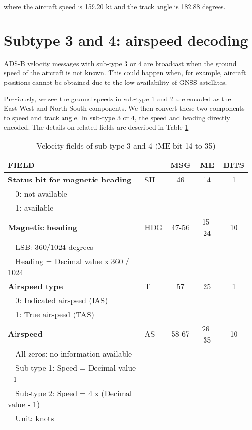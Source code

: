 where the aircraft speed is 159.20 kt and the track angle is 182.88 degrees.


\section{Subtype 3 and 4: airspeed decoding}

ADS-B velocity messages with sub-type 3 or 4 are broadcast when the ground speed of the aircraft is not known. This could happen when, for example, aircraft positions cannot be obtained due to the low availability of GNSS satellites.

Previously, we see the ground speeds in sub-type 1 and 2 are encoded as the East-West and North-South components. We then convert these two components to speed and track angle. In sub-type 3 or 4, the speed and heading directly encoded. The details on related fields are described in Table \ref{tb:adsb-velocity-bits-14-35-as}.

\begin{table}[ht]
\caption{Velocity fields of sub-type 3 and 4 (ME bit 14 to 35)}
\label{tb:adsb-velocity-bits-14-35-as}
\footnotesize
\begin{tabular}{|l|l|c|c|c|}
\hline
\textbf{FIELD} & & \textbf{MSG} & \textbf{ME} & \textbf{BITS} \\ \hline
\textbf{Status bit for magnetic heading}  & SH & 46 & 14 & 1\\
~~0: not available &&&& \\
~~1: available &&&& \\ \hline
\textbf{Magnetic heading} & HDG & 47-56 & 15-24 & 10 \\
~~LSB: 360/1024 degrees &&&& \\
~~Heading = Decimal value x 360 / 1024 &&&& \\ \hline
\textbf{Airspeed type} & T & 57 & 25 & 1\\
~~0: Indicated airspeed (IAS) &&&& \\
~~1: True airspeed (TAS) &&&& \\ \hline
\textbf{Airspeed} & AS & 58-67 & 26-35 & 10 \\
~~All zeros: no information available &&&& \\
~~Sub-type 1: Speed = Decimal value - 1 &&&& \\
~~Sub-type 2: Speed = 4 x (Decimal value - 1) &&&& \\
~~Unit: knots &&&& \\ \hline
\end{tabular}
\end{table}


